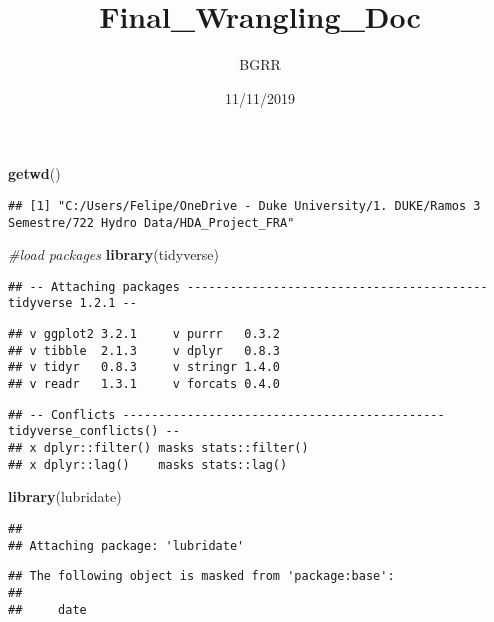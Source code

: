 \documentclass[]{article}
\title{Final\_Wrangling\_Doc}
\author{BGRR}
\date{11/11/2019}
\newenvironment{Shaded}{\begin{snugshade}}{\end{snugshade}}
\newcommand{\CommentTok}[1]{\textcolor[rgb]{0.56,0.35,0.01}{\textit{#1}}}
\newcommand{\KeywordTok}[1]{\textcolor[rgb]{0.13,0.29,0.53}{\textbf{#1}}}
\newcommand{\NormalTok}[1]{#1}
\begin{document}
\maketitle

\begin{Shaded}
\begin{Highlighting}[]
\KeywordTok{getwd}\NormalTok{()}
\end{Highlighting}
\end{Shaded}

\begin{verbatim}
## [1] "C:/Users/Felipe/OneDrive - Duke University/1. DUKE/Ramos 3 Semestre/722 Hydro Data/HDA_Project_FRA"
\end{verbatim}

\begin{Shaded}
\begin{Highlighting}[]
\CommentTok{#load packages}
\KeywordTok{library}\NormalTok{(tidyverse)}
\end{Highlighting}
\end{Shaded}

\begin{verbatim}
## -- Attaching packages ------------------------------------------ tidyverse 1.2.1 --
\end{verbatim}

\begin{verbatim}
## v ggplot2 3.2.1     v purrr   0.3.2
## v tibble  2.1.3     v dplyr   0.8.3
## v tidyr   0.8.3     v stringr 1.4.0
## v readr   1.3.1     v forcats 0.4.0
\end{verbatim}

\begin{verbatim}
## -- Conflicts --------------------------------------------- tidyverse_conflicts() --
## x dplyr::filter() masks stats::filter()
## x dplyr::lag()    masks stats::lag()
\end{verbatim}

\begin{Shaded}
\begin{Highlighting}[]
\KeywordTok{library}\NormalTok{(lubridate)}
\end{Highlighting}
\end{Shaded}

\begin{verbatim}
## 
## Attaching package: 'lubridate'
\end{verbatim}

\begin{verbatim}
## The following object is masked from 'package:base':
## 
##     date
\end{verbatim}
\end{document}
